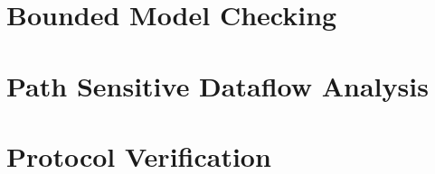 \section{Bounded Model Checking}

\section{Path Sensitive Dataflow Analysis}

\section{Protocol Verification}
